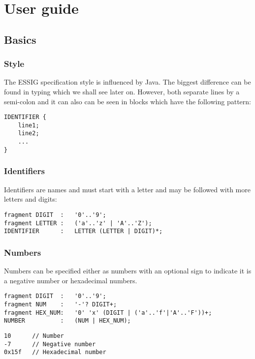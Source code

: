 \chapter{User guide}
\section{Basics}
\subsection{Style}
The \ac{ESSIG} specification style is influenced by Java. The biggest
difference can be found in typing which we shall see later on. However, both
separate lines by a semi-colon and it can also can be seen in blocks which have
the following pattern:

\lstset{caption=Block specification pattern}
\begin{lstlisting}
IDENTIFIER {
	line1;
	line2;
	...
}
\end{lstlisting}


\subsection[IDENTIFIER]{Identifiers}
Identifiers are names and must start with a letter and may be followed with
more letters and digits:

\lstset{caption=Identifier specifation}
\begin{lstlisting}
fragment DIGIT	:	'0'..'9';
fragment LETTER	:	('a'..'z' | 'A'..'Z');
IDENTIFIER		:	LETTER (LETTER | DIGIT)*;
\end{lstlisting}

\subsection{Numbers}
Numbers can be specified either as numbers with an optional sign to indicate it
is a negative number or hexadecimal numbers.

\lstset{caption=Number specifation}
\begin{lstlisting}
fragment DIGIT	:	'0'..'9';
fragment NUM	:	'-'? DIGIT+;
fragment HEX_NUM:	'0' 'x' (DIGIT | ('a'..'f'|'A'..'F'))+;
NUMBER			:	(NUM | HEX_NUM);
\end{lstlisting}

\lstset{caption=Example numbers}
\begin{lstlisting}
10		// Number
-7		// Negative number
0x15f	// Hexadecimal number
\end{lstlisting}

